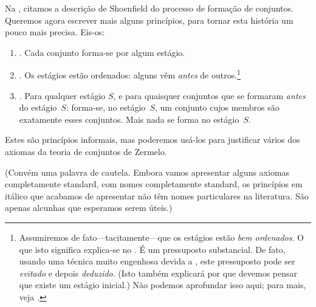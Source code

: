 \documentclass[../../../include/open-logic-section]{subfiles}
\begin{document}
	
Na , citamos a descrição de Shoenfield do
processo de formação de conjuntos. Queremos agora escrever
mais alguns princípios, para tornar esta história um pouco mais precisa. Eis-os:
\begin{enumerate}
\item[] \stageshier. Cada conjunto forma-se por algum estágio.
\item[] \stagesord. Os estágios estão ordenados: alguns vêm \emph{antes}
de outros.\footnote{Assumiremos de fato---tacitamente---que os estágios
estão \emph{bem ordenados}. O que isto significa explica-se no
. É um pressuposto substancial. De fato,
usando uma técnica muito engenhosa devida a \citet{Scott1974}, este
pressuposto pode ser \emph{evitado} e depois \emph{deduzido}. (Isto
também explicará por que devemos pensar que existe um estágio inicial.) Não podemos aprofundar isso aqui; para mais, veja \citet{ButtonLT1}.} 
\item[] \stagesacc. Para qualquer estágio $S$, e para quaisquer conjuntos que se
formaram \emph{antes} do estágio~$S$: forma-se, no estágio~$S$, um conjunto cujos
membros são exatamente esses conjuntos. Mais nada se forma no estágio~$S$.
\end{enumerate}
Estes são princípios informais, mas poderemos usá-los para
justificar vários dos axiomas da teoria de conjuntos de Zermelo. 

(Convém uma palavra de cautela. Embora vamos apresentar alguns
axiomas completamente standard, com nomes completamente standard, os
princípios em itálico que acabamos de apresentar não têm nomes particulares
na literatura. São apenas alcunhas que esperamos serem úteis.)
\end{document}
